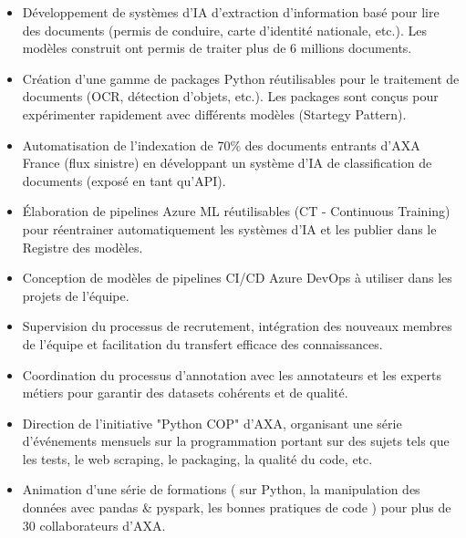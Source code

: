 \documentclass[10pt,letter,ragged2e,withhyper]{altacv}
\begin{document}
\begin{paracol}{2}



\begin{itemize}
  \item Développement de systèmes d'IA d'extraction d'information basé pour lire des documents (permis de conduire, carte d'identité nationale, etc.). Les modèles construit ont permis de traiter plus de 6 millions documents.
  \item Création d'une gamme de packages Python réutilisables pour le traitement de documents (OCR, détection d'objets, etc.). Les packages sont conçus pour expérimenter rapidement avec différents modèles (Startegy Pattern).
  \item Automatisation de l'indexation de 70\% des documents entrants d'AXA France (flux sinistre) en développant un système d'IA de classification de documents (exposé en tant qu'API).
  \item Élaboration de pipelines Azure ML réutilisables (CT - Continuous Training) pour réentrainer automatiquement les systèmes d'IA et les publier dans le Registre des modèles.
  \item Conception de modèles de pipelines CI/CD Azure DevOps à utiliser dans les projets de l'équipe.
  \item Supervision du processus de recrutement, intégration des nouveaux membres de l'équipe et facilitation du transfert efficace des connaissances.
  \item Coordination du processus d'annotation avec les annotateurs et les experts métiers pour garantir des datasets cohérents et de qualité.
  \item Direction de l'initiative "Python COP" d'AXA, organisant une série d'événements mensuels sur la programmation portant sur des sujets tels que les tests, le web scraping, le packaging, la qualité du code, etc.
  \item Animation d'une série de formations ( sur Python, la manipulation des données avec pandas \& pyspark, les bonnes pratiques de code ) pour plus de 30 collaborateurs d'AXA.
\end{itemize}


\end{paracol}
\end{document}
